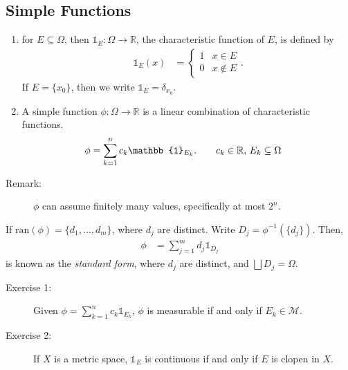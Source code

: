 \documentclass[9pt]{extarticle}
\newcommand{\R}{\mathbb{R}}
\begin{document}
  \subsection{Simple Functions}%
  \begin{enumerate}[(1)]
    \item for $E\subseteq \Omega$, then $\mathbb{1}_E: \Omega\rightarrow \R$, the characteristic function of $E$, is defined by
      \begin{align*}
        \mathbb{1}_E(x) &= \begin{cases}
          1 & x\in E\\
          0 & x\notin E
        \end{cases}.
      \end{align*}
        If $E = \{x_0\}$, then we write $\mathbb{1}_E = \delta_{x_0}$.
    \item A simple function $\phi: \Omega \rightarrow \R$ is a linear combination of characteristic functions.
      \begin{align*}
        \phi &= \sum_{k=1}^{n}c_k\mathbb{1}_{E_k}. \tag*{$c_k\in \R$, $E_k\subseteq \Omega$}
      \end{align*}
  \end{enumerate}
  \begin{description}
    \item[Remark:] $\phi$ can assume finitely many values, specifically at most $2^n$.
  \end{description}
  If $\text{ran}(\phi) = \{d_1,\dots,d_m\}$, where $d_j$ are distinct. Write $D_j = \phi^{-1}(\{d_j\})$. Then,
  \begin{align*}
    \phi &= \sum_{j=1}^{m}d_j\mathbb{1}_{D_j}
  \end{align*}
  is known as the \textit{standard form}, where $d_j$ are distinct, and $\bigsqcup D_j = \Omega$.
  \begin{description}
    \item[Exercise 1:] Given $\phi = \sum_{k=1}^{n}c_k\mathbb{1}_{E_k}$, $\phi$ is measurable if and only if $E_k \in \mathcal{M}$.
    \item[Exercise 2:] If $X$ is a metric space, $\mathbb{1}_E$ is continuous if and only if $E$ is clopen in $X$.
  \end{description}
\end{document}
